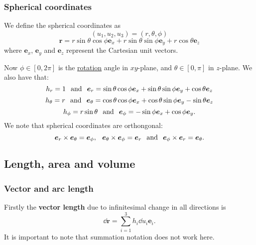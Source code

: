 \documentclass{article}
\begin{document}
\newpage

\subsubsection{Spherical coordinates}
We define the spherical coordinates as
$$(u_1,u_2,u_3)=(r,\theta,\phi)$$
$$\boldsymbol{r}=r\sin\theta\cos\phi\boldsymbol{e}_x
+r\sin\theta\sin\phi\boldsymbol{e}_y
+r\cos\theta\boldsymbol{e}_z$$
where $\boldsymbol{e}_x$, $\boldsymbol{e}_y$ and $\boldsymbol{e}_z$
represent the Cartesian unit vectors.

Now $\phi\in[0,2\pi]$ is the \underline{rotation} angle in $xy$-plane,
and $\theta\in[0,\pi]$ in $z$-plane. We also have that:
$$h_{r}=1\hspace{0.1in}\text{and}\hspace{0.1in}\boldsymbol{e}_{r}
=\sin\theta\cos\phi\boldsymbol{e}_x
+\sin\theta\sin\phi\boldsymbol{e}_y+\cos\theta\boldsymbol{e}_z$$
$$h_{\theta}=r\hspace{0.1in}\text{and}\hspace{0.1in}
\boldsymbol{e}_{\theta}
=\cos\theta\cos\phi\boldsymbol{e}_x+\cos\theta\sin\phi\boldsymbol{e}_y
-\sin\theta\boldsymbol{e}_z$$
$$h_{\phi}=r\sin\theta\hspace{0.1in}\text{and}\hspace{0.1in}\boldsymbol{e}_{\phi}
=-\sin\phi\boldsymbol{e}_x+\cos\phi\boldsymbol{e}_y.$$
We note that spherical coordinates are orthongonal:
$$\boldsymbol{e}_r\times\boldsymbol{e}_\theta
=\boldsymbol{e}_\phi,
\hspace{0.1in}
\boldsymbol{e}_\theta\times\boldsymbol{e}_\phi
=\boldsymbol{e}_r
\hspace{0.1in}\text{and}\hspace{0.1in}
\boldsymbol{e}_\phi\times\boldsymbol{e}_r
=\boldsymbol{e}_\theta.$$

\newpage

\subsection{Length, area and volume}

\subsubsection{Vector and arc length}
Firstly the \textbf{vector length} due to infinitesimal change in all directions is
$$\dd\boldsymbol{r}=\sum_{i=1}^{3}h_i\dd u_i\boldsymbol{e}_i.$$
It is important to note that summation notation does not work here.
\end{document}
